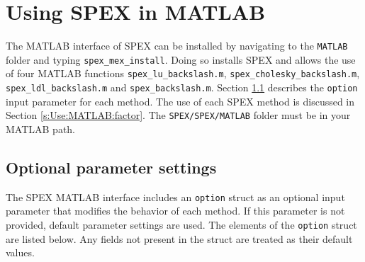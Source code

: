 \documentclass[12pt,oneside]{book}
\theoremstyle{definition}
\begin{document}
\chapter{Using SPEX in MATLAB}\vspace{-0.75in} \label{s:Use:MATLAB}
The MATLAB interface of SPEX can be installed by navigating to the \verb|MATLAB| folder and typing \verb|spex_mex_install|. 
Doing so installs SPEX and allows the use of four MATLAB functions \verb|spex_lu_backslash.m|, \verb|spex_cholesky_backslash.m|, \verb|spex_ldl_backslash.m| and \verb|spex_backslash.m|. Section \ref{s:Use:MATLAB:setup} describes the
\verb|option| input parameter for each method.
The use of each SPEX method is discussed in Section \ref{s:Use:MATLAB:factor}.
The \verb|SPEX/SPEX/MATLAB| folder must be in your MATLAB path.

\section{Optional parameter settings} \label{s:Use:MATLAB:setup}
The SPEX MATLAB interface includes an \verb|option| struct as an optional
input parameter that modifies the behavior of each method.  If this parameter is not provided,
default parameter settings are used.  The elements of the \verb'option' struct
are listed below.  Any fields not present in the struct are treated as their
default values.
\end{document}
